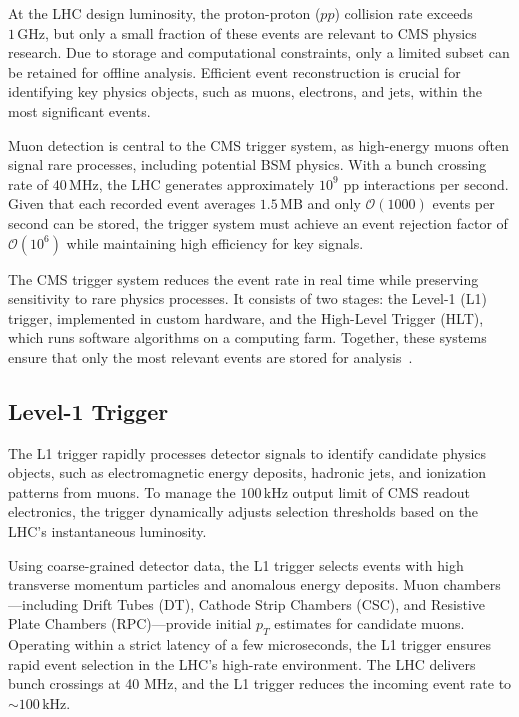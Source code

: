 At the LHC design luminosity, the proton-proton ($pp$) collision rate exceeds $1\,\mathrm{GHz}$, but only a small fraction of these events are relevant to CMS physics research. Due to storage and computational constraints, only a limited subset can be retained for offline analysis. Efficient event reconstruction is crucial for identifying key physics objects, such as muons, electrons, and jets, within the most significant events.

Muon detection is central to the CMS trigger system, as high-energy muons often signal rare processes, including potential BSM physics. With a bunch crossing rate of $40\,\mathrm{MHz}$, the LHC generates approximately $10^9$ pp interactions per second. Given that each recorded event averages $1.5\,\mathrm{MB}$ and only $\mathcal{O}(1000)$ events per second can be stored, the trigger system must achieve an event rejection factor of $\mathcal{O}(10^6)$ while maintaining high efficiency for key signals.

The CMS trigger system reduces the event rate in real time while preserving sensitivity to rare physics processes. It consists of two stages: the Level-1 (L1) trigger, implemented in custom hardware, and the High-Level Trigger (HLT), which runs software algorithms on a computing farm. Together, these systems ensure that only the most relevant events are stored for analysis~\cite{Cittolin:578006}.

\subsection{Level-1 Trigger}

The L1 trigger rapidly processes detector signals to identify candidate physics objects, such as electromagnetic energy deposits, hadronic jets, and ionization patterns from muons. To manage the $100\,\mathrm{kHz}$ output limit of CMS readout electronics, the trigger dynamically adjusts selection thresholds based on the LHC's instantaneous luminosity.

Using coarse-grained detector data, the L1 trigger selects events with high transverse momentum particles and anomalous energy deposits. Muon chambers---including Drift Tubes (DT), Cathode Strip Chambers (CSC), and Resistive Plate Chambers (RPC)---provide initial $p_T$ estimates for candidate muons. Operating within a strict latency of a few microseconds, the L1 trigger ensures rapid event selection in the LHC’s high-rate environment. The LHC delivers bunch crossings at 40 MHz, and the L1 trigger reduces the incoming event rate to $\sim100\,\mathrm{kHz}$.

